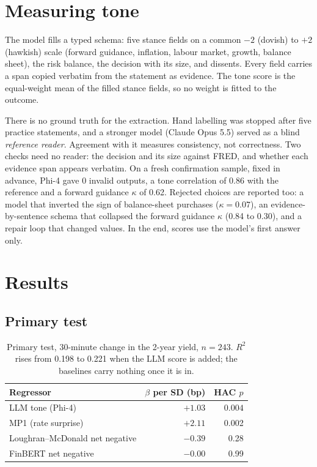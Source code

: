 \documentclass[11pt,a4paper]{article}
\begin{document}
\section{Measuring tone}

The model fills a typed schema: five stance fields on a common $-2$ (dovish) to $+2$ (hawkish)
scale (forward guidance, inflation, labour market, growth, balance sheet), the risk balance,
the decision with its size, and dissents. Every field carries a span copied verbatim from the
statement as evidence. The tone score is the equal-weight mean of the filled stance fields, so
no weight is fitted to the outcome.

There is no ground truth for the extraction. Hand labelling was stopped after five practice
statements, and a stronger model (Claude Opus 5.5) served as a blind \emph{reference reader}. Agreement
with it measures consistency, not correctness. Two checks need no reader: the decision and its
size against FRED, and whether each evidence span appears verbatim. On a fresh confirmation
sample, fixed in advance, Phi-4 gave 0 invalid outputs, a tone correlation of 0.86 with the
reference and a forward guidance $\kappa$ of 0.62. Rejected choices are reported too: a model
that inverted the sign of balance-sheet purchases ($\kappa = 0.07$), an evidence-by-sentence
schema that collapsed the forward guidance $\kappa$ (0.84 to 0.30), and a repair loop that
changed values. In the end, scores use the model's first answer only.

\section{Results}

\subsection{Primary test}

\begin{table}[H]
\centering\small
\begin{tabular}{lrr}
\toprule
Regressor & $\beta$ per SD (bp) & HAC $p$ \\
\midrule
LLM tone (Phi-4)                & $\mathbf{+1.03}$ & $\mathbf{0.004}$ \\
MP1 (rate surprise)             & $+2.11$ & 0.002 \\
Loughran--McDonald net negative & $-0.39$ & 0.28 \\
FinBERT net negative            & $-0.00$ & 0.99 \\
\bottomrule
\end{tabular}
\caption{Primary test, 30-minute change in the 2-year yield, $n = 243$. $R^2$ rises from
0.198 to 0.221 when the LLM score is added; the baselines carry nothing once it is in.}
\end{table}
\end{document}
